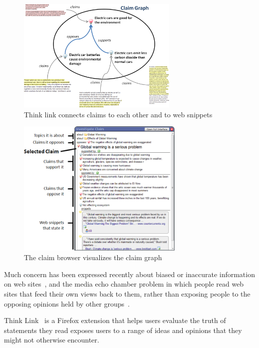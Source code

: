 \documentclass{chi2009}
\begin{document}
\begin{figure}[tb]
	\begin{center}
	\includegraphics[width=7.7cm]{../screenshots/summary_graph.png}
	\caption{Think link connects claims to each other and to web snippets}
	\label{summarygraph}
	\end{center}
\end{figure}

\begin{figure}[tb]
	\begin{center}
	\includegraphics[width=8cm]{../screenshots/claimbrowse_diagram.png}
	\caption{The claim browser visualizes the claim graph}
	\label{claimbrowse_diagram}
	\end{center}
\end{figure}


Much concern has been expressed recently about biased or inaccurate information on web sites~\cite{bbcwebwarning,wikifalse}, and the media echo chamber problem in which people read web sites that feed their own views back to them, rather than exposing people to the opposing opinions held by other groups~\cite{echochamber,echochamber2}. 

Think Link~\cite{thinklink} is a Firefox extension that helps users evaluate the truth of statements they read exposes users to a range of ideas and opinions that they might not otherwise encounter.
\end{document}
